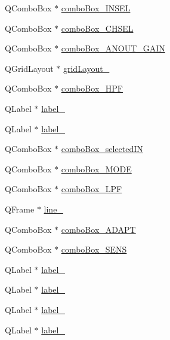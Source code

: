 \begin{DoxyCompactItemize}
\item 
Q\+Combo\+Box $\ast$ \hyperlink{class_ui___main_window_ae8d1b45c0cfcd6b434a75a17c9037a1c}{combo\+Box\+\_\+\+I\+N\+S\+EL}
\item 
Q\+Combo\+Box $\ast$ \hyperlink{class_ui___main_window_a967a6487fae379c728b22caf95f5e83f}{combo\+Box\+\_\+\+C\+H\+S\+EL}
\item 
Q\+Combo\+Box $\ast$ \hyperlink{class_ui___main_window_a11ba7790a2147e039fd80cd3330a93f6}{combo\+Box\+\_\+\+A\+N\+O\+U\+T\+\_\+\+G\+A\+IN}
\item 
Q\+Grid\+Layout $\ast$ \hyperlink{class_ui___main_window_a8ee86315639f324b17708efc7dbe8b19}{grid\+Layout\+\_}
\item 
Q\+Combo\+Box $\ast$ \hyperlink{class_ui___main_window_aaa3d8dbf2ffc2b6ea072f7ef88d1e5a0}{combo\+Box\+\_\+\+H\+PF}
\item 
Q\+Label $\ast$ \hyperlink{class_ui___main_window_a882200d8ae16962f5dd3b749ebacbf7e}{label\+\_}
\item 
Q\+Label $\ast$ \hyperlink{class_ui___main_window_a9dc4dba26b83e0c94aa566e1c564420b}{label\+\_}
\item 
Q\+Combo\+Box $\ast$ \hyperlink{class_ui___main_window_a25922bf1e0c13b9aac0498e48bdbbc2e}{combo\+Box\+\_\+selected\+IN}
\item 
Q\+Combo\+Box $\ast$ \hyperlink{class_ui___main_window_a16c04ddf40af3d97418246cfb04d9f82}{combo\+Box\+\_\+\+M\+O\+DE}
\item 
Q\+Combo\+Box $\ast$ \hyperlink{class_ui___main_window_a9e0aafa995e96d5c4dceba7788e29358}{combo\+Box\+\_\+\+L\+PF}
\item 
Q\+Frame $\ast$ \hyperlink{class_ui___main_window_a27e0b134c3c12643afbf0b50dd175453}{line\+\_}
\item 
Q\+Combo\+Box $\ast$ \hyperlink{class_ui___main_window_a21522c20bae36c7f4ba4cb2354a8b17d}{combo\+Box\+\_\+\+A\+D\+A\+PT}
\item 
Q\+Combo\+Box $\ast$ \hyperlink{class_ui___main_window_aeb8291dc37be1a33337d1e403d07ed37}{combo\+Box\+\_\+\+S\+E\+NS}
\item 
Q\+Label $\ast$ \hyperlink{class_ui___main_window_a1c16c0a684617927472e534822a63c7d}{label\+\_}
\item 
Q\+Label $\ast$ \hyperlink{class_ui___main_window_ab6ac4329a89041f557332f6569d94493}{label\+\_}
\item 
Q\+Label $\ast$ \hyperlink{class_ui___main_window_a4f12a71b4a2fb6f85df2300d83b5ed3e}{label\+\_}
\item 
Q\+Label $\ast$ \hyperlink{class_ui___main_window_ac1cbc41e9dbaeb3d0bdc2189d8e9ee1d}{label\+\_}

\end{DoxyCompactItemize}
